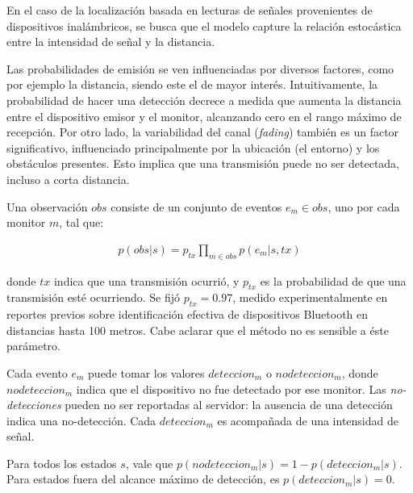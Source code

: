En el caso de la localización basada en lecturas de señales provenientes de dispositivos inalámbricos, se busca que el modelo capture la relación estocástica entre la intensidad de señal y la distancia.

Las probabilidades de emisión se ven influenciadas por diversos factores, como por ejemplo la distancia, siendo este el de mayor interés. Intuitivamente, la probabilidad de hacer una detección decrece a medida que aumenta la distancia entre el dispositivo emisor y el monitor, alcanzando cero en el rango máximo de recepción. Por otro lado, la variabilidad del canal (\textit{fading}) también es un factor significativo, influenciado principalmente por la ubicación (el entorno) y los obstáculos presentes. Esto implica que una transmisión puede no ser detectada, incluso a corta distancia. 

Una observación $obs$ consiste de un conjunto de eventos $e_m \in  obs$, uno por cada monitor $m$, tal que:

\begin{align}\label{eq:observacion}
 p(obs|s)= p_{tx}\prod_{m \in obs}{p(e_m|s,tx)}
\end{align}

donde $tx$ indica que una transmisión ocurrió, y $p_{tx}$ es la probabilidad de que una transmisión esté ocurriendo. Se fijó $p_{tx}=0.97$, medido experimentalmente en reportes previos sobre identificación efectiva de dispositivos Bluetooth en distancias hasta 100 metros\cite{huang2014blueid}. Cabe aclarar que el método no es sensible a éste parámetro.

Cada evento $e_m$ puede tomar los valores $deteccion_m$ o $nodeteccion_m$, donde $nodeteccion_m$ indica que el dispositivo no fue detectado por ese monitor. Las \textit{no-detecciones} pueden no ser reportadas al servidor: la ausencia de una detección indica una no-detección. Cada $deteccion_m$ es acompañada de una intensidad de señal. 

Para todos los estados $s$, vale que $p(nodeteccion_m|s) = 1 - p(deteccion_m|s)$. Para estados fuera del alcance máximo de detección, es $p(deteccion_m|s) = 0$. 


